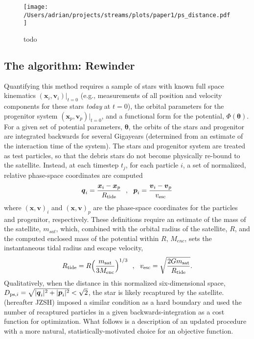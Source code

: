 \documentclass[preprint]{aastex}
\newcommand{\bs}{\boldsymbol}
\begin{document}
\begin{figure}[h]
\begin{center}
\texttt{[image: /Users/adrian/projects/streams/plots/paper1/ps\_distance.pdf]}
\caption{ todo }\label{fig:ps_distance}
\end{center}
\end{figure}

\subsection{The algorithm: Rewinder}
Quantifying this method requires a sample of stars with known full
space kinematics $(\bs{x}_{i}, \bs{v}_{i})|_{t=0}$ (e.g., measurements
of all position and velocity components for these stars \emph{today}
at $t=0$), the orbital parameters for the progenitor system
$(\bs{x}_p, \bs{v}_p)|_{t=0}$, and a functional form for the
potential, $\Phi({\boldsymbol\theta})$. For a given set of potential
parameters, $\boldsymbol\theta$, the orbits of the stars and
progenitor are integrated backwards for several Gigayears (determined
from an estimate of the interaction time of the system). The stars and
progenitor system are treated as test particles, so that the debris
stars do not become physically re-bound to the satellite. Instead, at
each timestep $t_j$, for each particle $i$, a set of normalized,
relative phase-space coordinates are computed
\begin{equation}
  \bs{q}_{i} = \frac{\bs{x}_{i} -
    \bs{x}_{p}}{R_{\rm tide}}\,\,\,\,,\,\,\,\,\bs{p}_{i} = \frac{\bs{v}_{i} -
    \bs{v}_{p}}{v_{\rm esc}}
\end{equation}
where $(\bs{x},\bs{v})_{i}$ and $(\bs{x},\bs{v})_{p}$ are the
phase-space coordinates for the particles and progenitor,
respectively. These definitions require an estimate of the mass of the
satellite, $m_{sat}$, which, combined with the orbital radius of the
satellite, $R$, and the computed enclosed mass of the potential within
$R$, $M_{enc}$, sets the instantaneous tidal radius and escape
velocity,
\begin{equation}
  R_{\rm tide}=R\Big(\frac{m_{\rm sat}}{3M_{\rm enc}}\Big)^{1/3}\,\,\,\,,\,\,\,\,
  v_{\rm esc}=\sqrt{\frac{2Gm_{\rm sat}}{R_{\rm tide}}}.
\end{equation}
Qualitatively, when the distance in this normalized six-dimensional
space, $D_{{\rm ps},i}=\sqrt{|\bs{q}_{i}|^2+|\bs{p}_{i}|^2} <
\sqrt{2}$, the star is likely recaptured by the
satellite. \citet{johnston99a} (hereafter JZSH) imposed a similar
condition as a hard boundary and used the number of recaptured
particles in a given backwards-integration as a cost function for
optimization. What follows is a description of an updated procedure
with a more natural, statistically-motivated choice for an objective
function.
\end{document}
